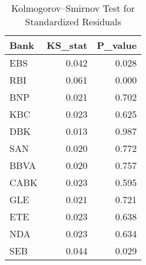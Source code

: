 \begin{table}

\caption{Kolmogorov–Smirnov Test for Standardized Residuals}
\centering
\begin{tabular}[t]{lrr}
\toprule
Bank & KS\_stat & P\_value\\
\midrule
EBS & 0.042 & 0.028\\
RBI & 0.061 & 0.000\\
BNP & 0.021 & 0.702\\
KBC & 0.023 & 0.625\\
DBK & 0.013 & 0.987\\
\addlinespace
SAN & 0.020 & 0.772\\
BBVA & 0.020 & 0.757\\
CABK & 0.023 & 0.595\\
GLE & 0.021 & 0.721\\
ETE & 0.023 & 0.638\\
\addlinespace
NDA & 0.023 & 0.634\\
SEB & 0.044 & 0.029\\
\bottomrule
\end{tabular}
\end{table}
